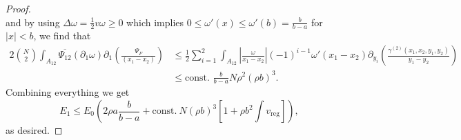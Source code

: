 \documentclass[a4paper,11pt]{article}
\newcommand{\abs}[1]{\left\lvert #1 \right\rvert}
\numberwithin{equation}{section}
\begin{document}
\begin{proof}
\begin{equation}
		\end{equation}
		and by using $ \Delta\omega=\frac{1}{2}v\omega\geq0 $ which implies $ 0\leq\omega'(x)\leq \omega'(b)=\frac{b}{b-a} $ for $ \abs{x}<b $, we find that \begin{equation}
		\begin{aligned}
		2\binom{N}{2}\int_{A_{12}}\overline{\Psi_{12}}(\partial_1\omega)\partial_1\left(\frac{\Psi_F}{(x_1-x_2)}\right)&\leq\frac12\sum_{i=1}^{2}\int_{A_{12}}\abs{\frac{\omega}{x_1-x_2}}(-1)^{i-1}\omega'(x_1-x_2)\partial_{y_i}\left(\frac{\gamma^{(2)}(x_1,x_2,y_1,y_2)}{y_1-y_2}\right)\\
		&\leq \text{const. }\frac{b}{b-a}N\rho^2(\rho b)^3.
		\end{aligned}
		\end{equation}
		Combining everything we get \begin{equation}
		E_1\leq E_0 \left(2\rho a\frac{b}{b-a}+ \text{const.}\ N(\rho b)^3\left[ 1+ \rho b^2\int v_{\text{reg}}\right]\right),
		\end{equation}
		as desired.
	\end{proof}
\end{document}
